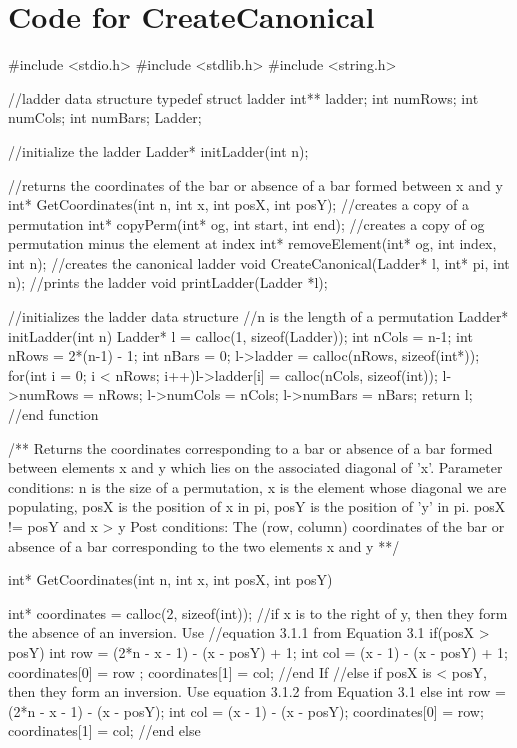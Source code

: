 \section{Code for {\sc CreateCanonical}}
\begin{singlespace}
\begin{footnotesize}
\begin{code}

#include <stdio.h>
#include <stdlib.h>
#include <string.h>


//ladder data structure
typedef struct ladder
{
    int** ladder;
    int numRows;
    int numCols;
    int numBars;
} Ladder;

//initialize the ladder 
Ladder* initLadder(int n);

//returns the coordinates of the bar or absence of a bar formed between x and y
int* GetCoordinates(int n, int x, int posX, int posY);
//creates a copy of a permutation
int* copyPerm(int* og, int start, int end);
//creates a copy of og permutation minus the element at index
int* removeElement(int* og, int index, int n);
//creates the canonical ladder
void CreateCanonical(Ladder* l, int* pi, int n);
//prints the ladder
void printLadder(Ladder *l);


//initializes the ladder data structure
//n is the length of a permutation
Ladder* initLadder(int n)
{
	Ladder* l = calloc(1, sizeof(Ladder));
	int nCols = n-1;
	int nRows = 2*(n-1) - 1;
	int nBars = 0;
	l->ladder = calloc(nRows, sizeof(int*));
	for(int i = 0; i < nRows; i++)l->ladder[i] = calloc(nCols, sizeof(int));
	l->numRows = nRows;
	l->numCols = nCols;
	l->numBars = nBars;
	return l;
}//end function

/**
	Returns the coordinates corresponding to a bar or absence of a bar 
	formed between elements x and y which lies on the associated diagonal of 'x'. 
	Parameter conditions: n is the size of a permutation, x is the element whose diagonal we are populating, posX is the position of x in pi, 
							posY is the position of 'y' in pi. posX != posY and x > y
    Post conditions: The (row, column) coordinates of the bar or absence of a bar corresponding to the two elements x and y
**/ 

int* GetCoordinates(int n, int x, int posX, int posY){
	
	int* coordinates = calloc(2, sizeof(int));
	//if x is to the right of y, then they form the absence of an inversion. Use 
	//equation 3.1.1 from Equation 3.1
	if(posX > posY){
		int row = (2*n - x - 1) - (x - posY) + 1;
		int col = (x - 1) - (x - posY) + 1;
		coordinates[0] = row ;
		coordinates[1] = col;
	}//end If
	//else if posX is < posY, then they form an inversion. Use equation 3.1.2 from Equation 3.1
	else{
		int row = (2*n - x - 1) - (x - posY);
		int col = (x - 1) - (x - posY);
		coordinates[0] = row;
		coordinates[1] = col;
	}//end else 

}
\end{code}
\end{footnotesize}
\end{singlespace}

